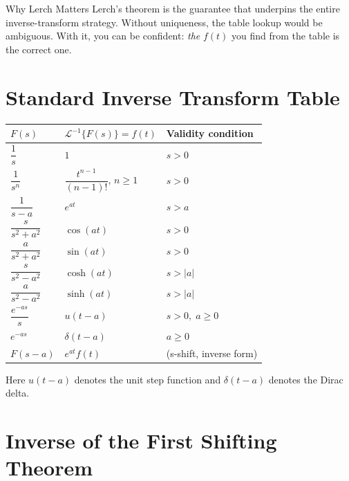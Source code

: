 \documentclass[12pt,a4paper]{article}
\begin{document}
\begin{learnbox}{Why Lerch Matters}
Lerch's theorem is the guarantee that underpins the entire inverse-transform
strategy. Without uniqueness, the table lookup would be ambiguous. With it,
you can be confident: \emph{the} $f(t)$ you find from the table is the
correct one.
\end{learnbox}

\section{Standard Inverse Transform Table}

\begin{center}
\begin{tabular}{@{}lll@{}}
\toprule
$F(s)$ & $\mathcal{L}^{-1}\{F(s)\} = f(t)$ & Validity condition \\
\midrule
$\dfrac{1}{s}$ & $1$ & $s>0$ \\[8pt]
$\dfrac{1}{s^n}$ & $\dfrac{t^{n-1}}{(n-1)!}$, \; $n \geq 1$ & $s>0$ \\[8pt]
$\dfrac{1}{s-a}$ & $e^{at}$ & $s>a$ \\[8pt]
$\dfrac{s}{s^2+a^2}$ & $\cos(at)$ & $s>0$ \\[8pt]
$\dfrac{a}{s^2+a^2}$ & $\sin(at)$ & $s>0$ \\[8pt]
$\dfrac{s}{s^2-a^2}$ & $\cosh(at)$ & $s>|a|$ \\[8pt]
$\dfrac{a}{s^2-a^2}$ & $\sinh(at)$ & $s>|a|$ \\[8pt]
$\dfrac{e^{-as}}{s}$ & $u(t-a)$ & $s>0,\; a\geq 0$ \\[8pt]
$e^{-as}$ & $\delta(t-a)$ & $a\geq 0$ \\[8pt]
$F(s-a)$ & $e^{at}f(t)$ & (s-shift, inverse form) \\[4pt]
\bottomrule
\end{tabular}
\end{center}

\noindent Here $u(t-a)$ denotes the unit step function and $\delta(t-a)$
denotes the Dirac delta.

\section{Inverse of the First Shifting Theorem}
\end{document}
